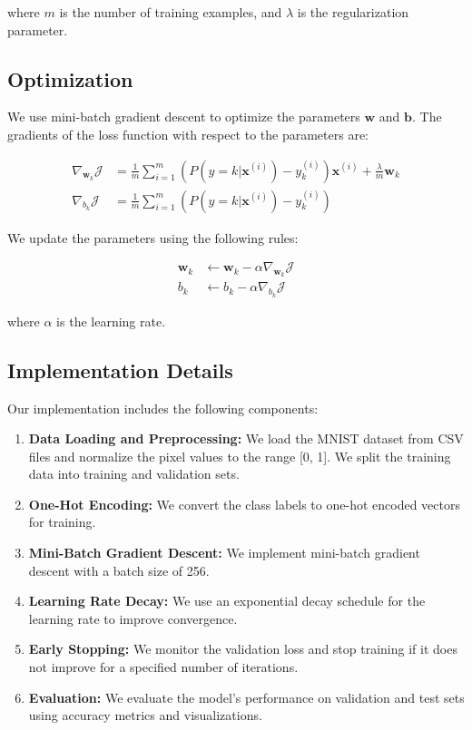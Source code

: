 \documentclass[10pt,journal,compsoc]{IEEEtran}
\begin{document}
where $m$ is the number of training examples, and $\lambda$ is the regularization parameter.

\subsection{Optimization}
We use mini-batch gradient descent to optimize the parameters $\mathbf{w}$ and $\mathbf{b}$. The gradients of the loss function with respect to the parameters are:

\begin{align}
\nabla_{\mathbf{w}_k} \mathcal{J} &= \frac{1}{m} \sum_{i=1}^{m} (P(y = k | \mathbf{x}^{(i)}) - y_k^{(i)}) \mathbf{x}^{(i)} + \frac{\lambda}{m} \mathbf{w}_k \\
\nabla_{b_k} \mathcal{J} &= \frac{1}{m} \sum_{i=1}^{m} (P(y = k | \mathbf{x}^{(i)}) - y_k^{(i)})
\end{align}

We update the parameters using the following rules:

\begin{align}
\mathbf{w}_k &\leftarrow \mathbf{w}_k - \alpha \nabla_{\mathbf{w}_k} \mathcal{J} \\
b_k &\leftarrow b_k - \alpha \nabla_{b_k} \mathcal{J}
\end{align}

where $\alpha$ is the learning rate.

\subsection{Implementation Details}
Our implementation includes the following components:

\begin{enumerate}
    \item \textbf{Data Loading and Preprocessing:} We load the MNIST dataset from CSV files and normalize the pixel values to the range [0, 1]. We split the training data into training and validation sets.
    
    \item \textbf{One-Hot Encoding:} We convert the class labels to one-hot encoded vectors for training.
    
    \item \textbf{Mini-Batch Gradient Descent:} We implement mini-batch gradient descent with a batch size of 256.
    
    \item \textbf{Learning Rate Decay:} We use an exponential decay schedule for the learning rate to improve convergence.
    
    \item \textbf{Early Stopping:} We monitor the validation loss and stop training if it does not improve for a specified number of iterations.
    
    \item \textbf{Evaluation:} We evaluate the model's performance on validation and test sets using accuracy metrics and visualizations.
\end{enumerate}
\end{document}
